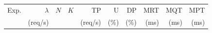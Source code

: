 \begin{tabular}{lrrrrrrrrr}
\toprule
Exp. & $\lambda$ & $N$ & $K$ & TP & U & DP & MRT & MQT & MPT \\
 & (req/s) & & & (req/s) & (\%) & (\%) & (ms) & (ms) & (ms) \\
\midrule
\bottomrule
\end{tabular}
